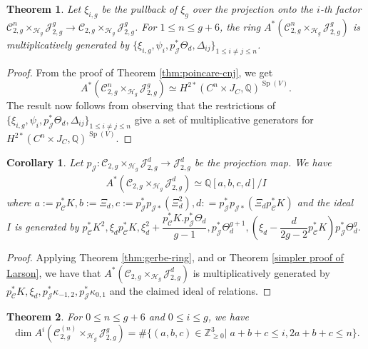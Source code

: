 \documentclass[11pt]{amsart}
\newcommand\Z{\mathbb{Z}}
\newtheorem{theorem}{Theorem}[section]
\newtheorem{corollary}{Corollary}[theorem]
\theoremstyle{definition}
\newcommand{\ri}{\rightarrow}
\newcommand{\J}{\mathscr{J}}
\newcommand{\jac}{\mathcal{J}}
\newcommand{\h}{\mathcal{H}}
\newcommand{\Q}{\mathbb{Q}}
\newcommand{\mC}{\mathcal{C}}
\newcommand{\ka}{\kappa}
\newcommand{\T}{\Theta}
\begin{document}
\begin{theorem}\label{thm:cn-j}
    Let $\xi_{i,g}$ be the pullback of $\xi_g$ over the projection onto the $i$-th factor $\mC_{2,g}^n\times_{\h_g}\jac^g_{2,g}\ri\mC_{2,g}\times_{\h_g}\jac^g_{2,g}$.
For $1\leq n\leq g+6$, the ring $A^*(\mC_{2,g}^n\times_{\h_g}\jac^g_{2,g})$ is multiplicatively generated by $\{\xi_{i,g},\psi_{i},p_\jac^*\T_d,\Delta_{ij}\}_{1\leq i\neq j\leq n}$.
\end{theorem}
\begin{proof}
 From the proof of Theorem \ref{thm:poincare-cnj}, we get \begin{equation*}
      A^* (\mC_{2,g}^{n}\times_{\h_g}\jac^g_{2,g}) \simeq  H^{2*} (C^{n} \times J_C ,\mathbb Q)^{\operatorname{Sp}(V)}.
 \end{equation*}
 The result now follows from observing that the restrictions of $\{\xi_{i,g},\psi_{i},p_\jac^*\T_d,\Delta_{ij}\}_{1\leq i\neq j\leq n}$ give a set of multiplicative generators for $H^{2*}(C^n \times J_C,\mathbb Q)^{\operatorname{Sp}(V)}$.  
\end{proof}
\begin{corollary}
    Let $p_\jac: \mC_{2,g}\times_{\h_g}\J^d_{2,g}\ri \J^d_{2,g}$ be the projection map. We have
    \begin{align*}A^*(\mC_{2,g}\times_{\h_g}\J^d_{2,g})\simeq \Q[a,b ,c ,d]/I\end{align*}
    where $a:= p_\mC^*K, b:= \Xi_d,c:= p_\J^*p_{\J *}(\Xi_d^2),d: = p_\J^*p_{\J *}(\Xi_dp_\mC^*K)$ and the ideal\\
     $I$ is generated by
    $p_\mC^*K^2, \xi_d p_\mC^*K, \xi_d^2+\dfrac{p_\mC^*K.p_\J^*\T_d}{g-1}, p_\J^*\T_d^{g+1},(\xi_d-\dfrac{d}{2g-2}p_\mC^*K)p_\J^*\T_d^{g}$. 
\end{corollary}
\begin{proof}
Applying Theorem \ref{thm:gerbe-ring}, and \cite[Theorem 1.1]{larson-24} or Theorem \ref{simpler proof of Larson}, we have that 
$A^*(\mC_{2,g}\times_{\h_g}\J^d_{2,g})$ is multiplicatively generated by $p_\mC^*K, \xi_d, p_\J^*\ka_{-1,2},p_\J^*\ka_{0,1}$ and the claimed ideal of relations. 
\end{proof}
\begin{theorem}
    For $0\leq n\leq  g+6$ and $0\leq i\leq g$, we have 
    $$\dim A^i(\mC_{2,g}^{(n)}\times_{\h_g}\jac^g_{2,g}) = \#\{(a,b,c)\in \Z_{\geq 0}^3|\; a+b+c\leq i, 2a+b+c\leq n\}.$$
\end{theorem}
\end{document}
